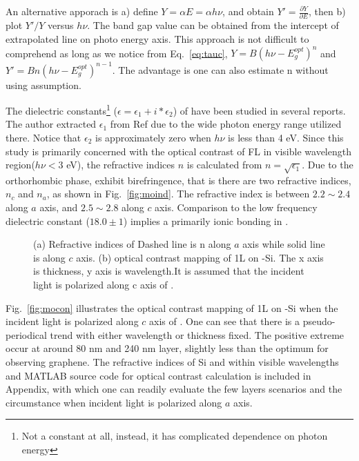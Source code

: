 An alternative apporach is a) define $Y = \alpha E=\alpha h\nu$, and obtain $Y' = \frac{\partial Y}{\partial E}$, then b) plot $Y'/Y$ versus $h\nu$. The band gap value can be obtained from the intercept of extrapolated line on photo energy axis.\cite{Choopun} This approach is not difficult to comprehend as long as we notice from Eq.~\ref{eq:tauc}, $Y = B (h\nu - E_g^{opt})^n$ and $Y' = B n(h\nu - E_g^{opt})^{n-1}$. The advantage is one can also estimate n without using assumption.

The dielectric constants\footnote{Not a constant at all, instead, it has complicated dependence on photon energy} ($\epsilon = \epsilon_1 + i*\epsilon_2$) of  have been studied in several reports.\cite{Deb1968,Sabhapathi1995,Miyata1996,Abdellaoui1997,Mondragon1999} The author extracted $\epsilon_1$ from Ref\cite{Itoh2001a} due to the wide photon energy range utilized there. Notice that $\epsilon_2$ is approximately zero when $h\nu$ is less than 4 eV. Since this study is primarily concerned with the optical contrast of FL  in visible wavelength region($h\nu < 3$ eV), the refractive indices $n$ is calculated from $n = \sqrt{\epsilon_1}$. Due to the orthorhombic phase,  exhibit birefringence, that is there are two refractive indices, $n_c$ and $n_a$, as shown in Fig.~\ref{fig:moind}. The refractive index is between $ 2.2\sim 2.4$ along $a$ axis, and $ 2.5\sim 2.8$ along $c$ axis. Comparison to the low frequency dielectric constant ($18.0\pm1$) implies a primarily ionic bonding in .\cite{He2003}

\begin{figure}[htb]
\centering
{}\hspace{0.04\textwidth}
\caption[Refractive indices of ]{(a) Refractive indices of  Dashed line is n along $a$ axis while solid line is along $c$ axis. (b) optical contrast mapping of 1L  on -Si. The x axis is  thickness, y axis is wavelength.It is assumed that the incident light is polarized along c axis of .}
\label{fig:mofl}
\end{figure}

Fig.~\ref{fig:mocon} illustrates the optical contrast mapping of 1L  on -Si when the incident light is polarized along $c$ axis of . One can see that there is a pseudo-periodical trend with either wavelength or  thickness fixed. The positive extreme occur at around 80 nm and 240 nm  layer, slightly less than the optimum for observing graphene. The refractive indices of Si and  within visible wavelengths and MATLAB source code for optical contrast calculation is included in Appendix, with which one can readily evaluate the few layers  scenarios and the circumstance when incident light is polarized along $a$ axis.

